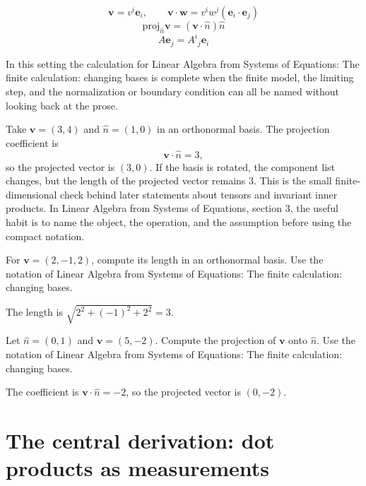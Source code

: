 \[
  \bm v=v^i\bm e_i,\qquad \bm v\cdot\bm w=v^iw^j(\bm e_i\cdot\bm e_j)
\]
\[
  \mathrm{proj}_{\hat n}\bm v=(\bm v\cdot\hat n)\hat n
\]
\[
  A\bm e_j=A^i{}_j\bm e_i
\]

In this setting the calculation for Linear Algebra from Systems of Equations: The finite calculation: changing bases is complete when the finite model, the limiting step, and the normalization or boundary condition can all be named without looking back at the prose.




\begin{example}
Take \(\bm v=(3,4)\) and \(\hat n=(1,0)\) in an orthonormal basis.  The projection coefficient is
\[
  \bm v\cdot\hat n=3,
\]
so the projected vector is \((3,0)\).  If the basis is rotated, the component list changes, but the length of the projected vector remains \(3\).  This is the small finite-dimensional check behind later statements about tensors and invariant inner products.  In Linear Algebra from Systems of Equations, section 3, the useful habit is to name the object, the operation, and the assumption before using the compact notation.
\end{example}



\begin{exercise}
For \(\bm v=(2,-1,2)\), compute its length in an orthonormal basis.  Use the notation of Linear Algebra from Systems of Equations: The finite calculation: changing bases.
\begin{answer}
The length is \(\sqrt{2^2+(-1)^2+2^2}=3\).
\end{answer}
\end{exercise}

\begin{exercise}
Let \(\hat n=(0,1)\) and \(\bm v=(5,-2)\).  Compute the projection of \(\bm v\) onto \(\hat n\).  Use the notation of Linear Algebra from Systems of Equations: The finite calculation: changing bases.
\begin{answer}
The coefficient is \(\bm v\cdot\hat n=-2\), so the projected vector is \((0,-2)\).
\end{answer}
\end{exercise}



\section{The central derivation: dot products as measurements}


